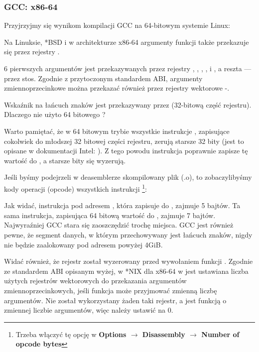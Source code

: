 \subsubsection{GCC: x86-64}

Przyjrzyjmy się wynikom kompilacji GCC na 64-bitowym systemie Linux:



Na Linuksie, *BSD i \MacOSX w architekturze x86-64 argumenty funkcji także przekazuje się przez rejestry \SysVABI.

6 pierwszych argumentów jest przekazywanych przez rejestry \RDI, \RSI, \RDX, \RCX,  i , a reszta --- przez stos.
Zgodnie z przytoczonym standardem ABI, argumenty zmiennoprzecinkowe można przekazać również przez rejestry wektorowe -.

Wskaźnik na łańcuch znaków jest przekazywany przez \EDI (32-bitową część rejestru). Dlaczego nie użyto 64 bitowego \RDI?

Warto pamiętać, że w 64 bitowym trybie wszystkie instrukcje \MOV, zapisujące cokolwiek do młodszej 32 bitowej części rejestru, zerują starsze 32 bity (jest to opisane w dokumentacji Intel: ).
Z tego powodu instrukcja  poprawnie zapisze tę wartość do \RAX, a starsze bity się wyzerują.

Jeśli byśmy podejrzeli w deasemblerze \IDA skompilowany plik (.o), to zobaczylibyśmy kody operacji (opcode) wszystkich instrukcji
\footnote{Trzeba włączyć tę opcję w \textbf{Options $\rightarrow$ Disassembly $\rightarrow$ Number of opcode bytes}}:



\label{hw_EDI_instead_of_RDI}
Jak widać, instrukcja \MOV pod adresem , która zapisuje do \EDI, zajmuje 5 bajtów.
Ta sama instrukcja, zapisująca 64 bitową wartość do \RDI, zajmuje 7 bajtów.
Najwyraźniej GCC stara się zaoszczędzić trochę miejsca.
GCC jest również pewne, że segment danych, w którym przechowywany jest łańcuch znaków, nigdy nie będzie zaalokowany pod adresem powyżej 4\gls{GiB}.

\label{SysVABI_input_EAX}
Widać również, że rejestr \EAX został wyzerowany przed wywołaniem funkcji \printf.
Zgodnie ze standardem \ac{ABI} opisanym wyżej, w *NIX dla x86-64 w \EAX jest ustawiana liczba użytych rejestrów wektorowych do przekazania argumentów zmiennoprzecinkowych, jeśli funkcja może przyjmować zmienną liczbę argumentów.
Nie został wykorzystany żaden taki rejestr, a \printf jest funkcją o zmiennej liczbie argumentów, więc należy ustawić \EAX na 0.
